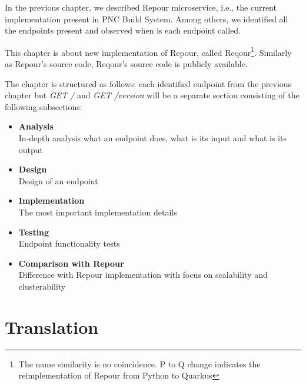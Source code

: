 \documentclass[../../main.tex]{subfiles}
\begin{document}
In the previous chapter, we described Repour microservice, i.e., the current implementation present in PNC Build System. Among others, we identified all the endpoints present and observed when is each endpoint called.

This chapter is about new implementation of Repour, called Reqour\footnote{The name similarity is no coincidence. P to Q change indicates the reimplementation of Repour from Python to Quarkus}. Similarly as Repour's source code, Reqour's source code is publicly available\cite{reqour}.

The chapter is structured as follows: each identified endpoint from the previous chapter but \textit{GET /} and \textit{GET /version} will be a separate section consisting of the following subsections:

\begin{itemize}
    \item \textbf{Analysis}\\
    In-depth analysis what an endpoint does, what is its input and what is its output

    \item \textbf{Design}\\
    Design of an endpoint

    \item \textbf{Implementation}\\
    The most important implementation details

    \item \textbf{Testing}\\
    Endpoint functionality tests

    \item \textbf{Comparison with Repour}\\
    Difference with Repour implementation with focus on scalability and clusterability
\end{itemize}


\section{Translation}

\end{document}

